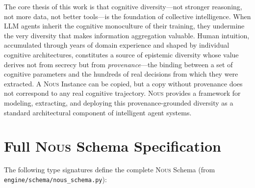 \documentclass[11pt]{article}
\newcommand{\nous}{\textsc{Nous}}
\begin{document}
The core thesis of this work is that cognitive diversity---not stronger reasoning, not more data, not better tools---is the foundation of collective intelligence. When LLM agents inherit the cognitive monoculture of their training, they undermine the very diversity that makes information aggregation valuable. Human intuition, accumulated through years of domain experience and shaped by individual cognitive architectures, constitutes a source of epistemic diversity whose value derives not from secrecy but from \emph{provenance}---the binding between a set of cognitive parameters and the hundreds of real decisions from which they were extracted. A \nous{} Instance can be copied, but a copy without provenance does not correspond to any real cognitive trajectory. \nous{} provides a framework for modeling, extracting, and deploying this provenance-grounded diversity as a standard architectural component of intelligent agent systems.






\newpage
\appendix

\section{Full \nous{} Schema Specification}
\label{app:schema}

The following type signatures define the complete \nous{} Schema (from \texttt{engine/schema/nous\_schema.py}):
\end{document}

